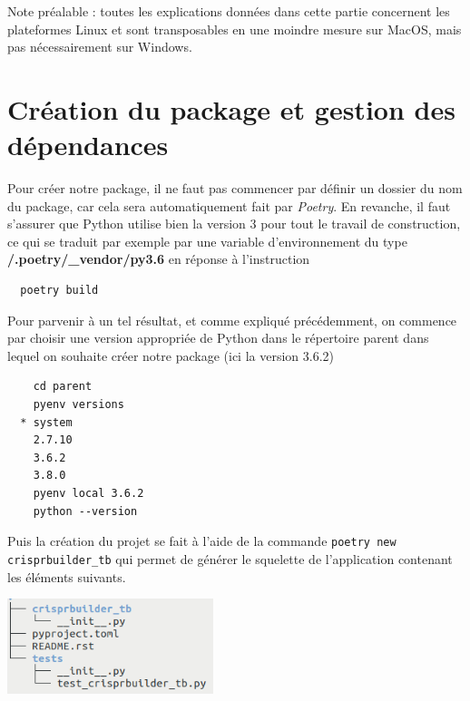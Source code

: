 \documentclass[twoside,a4paper,11pt,frenchb,openany]{report}
\begin{document}
Note préalable : toutes les explications données dans cette partie concernent les plateformes Linux et sont transposables en une moindre mesure sur MacOS, mais pas nécessairement sur Windows.


\section{Création du package et gestion des dépendances}

Pour créer notre package, il ne faut pas commencer par définir un dossier du nom du package, car cela sera automatiquement fait par \textit{Poetry}. En revanche, il faut s'assurer que Python utilise bien la version 3 pour tout le travail de construction, ce qui se traduit par exemple par une variable d'environnement du type \textbf{\raisebox{-1ex}{\textasciitilde}/.poetry/\_vendor/py3.6} en réponse à l'instruction 
\begin{verbatim}  poetry build\end{verbatim}
Pour parvenir à un tel résultat, et comme expliqué précédemment, on commence par choisir une version appropriée de Python dans le répertoire parent dans lequel on souhaite créer notre package (ici la version 3.6.2)
 \begin{verbatim}    cd parent
    pyenv versions
  * system
    2.7.10
    3.6.2
    3.8.0
    pyenv local 3.6.2
    python --version\end{verbatim}

Puis la création du projet se fait à l'aide de la commande
\texttt{poetry new crisprbuilder\_tb}
qui permet de générer le squelette de l'application contenant les éléments suivants.

\includegraphics[width=6cm]{nom_package_tree.png}
\end{document}
